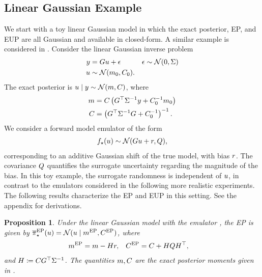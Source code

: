 \documentclass[12pt]{article}
\newtheorem{prop}{Proposition}
\begin{document}
\subsection{Linear Gaussian Example}
We start with a toy linear Gaussian model in which the exact posterior, EP, and EUP are all 
Gaussian and available in closed-form. A similar example is considered in
\citet{garegnani2021NoisyMCMC}.
Consider the linear Gaussian inverse problem
\begin{align}
y &= G u + \epsilon
&&\epsilon \sim \mathcal{N}(0, \Sigma) \label{eq:lin-Gauss-inv-prob} \\
u &\sim \mathcal{N}(m_0, C_0). \nonumber
\end{align}
The exact posterior is $u \mid y \sim \mathcal{N}(m, C)$, where
\begin{align}
m &= C \left(G^\top \Sigma^{-1}y + C_0^{-1}m_0 \right) \label{eq:lin-Gauss-post-moments} \\
C &= \left(G^\top \Sigma^{-1}G + C_0^{-1} \right)^{-1}. \nonumber
\end{align}
We consider a forward model emulator of the form
\begin{align}
{f}_{\star}(u) \sim \mathcal{N}(Gu + r, Q) \label{eq:lin-Gauss-em}, 
\end{align}
corresponding to an additive Gaussian shift of the true model, with bias $r$.
The covariance $Q$ quantifies the surrogate uncertainty regarding the magnitude of the bias.
In this toy example, the surrogate randomness is independent of $u$, in contrast to the 
emulators considered in the following more realistic experiments.
The following results characterize the EP and EUP in this setting. See the appendix for derivations.

\begin{prop}
Under the linear Gaussian model  with the emulator ,
the EP is given by ${\overline{\pi}}_{\star}^{\mathrm{EP}}(u) = \mathcal{N}(u \mid m^{\mathrm{EP}}, C^{\mathrm{EP}})$, where
\begin{align*}
m^{\mathrm{EP}} &= m - H r,
&&C^{\mathrm{EP}} = C + H Q H^\top,
\end{align*}
and $H \coloneqq C G^\top \Sigma^{-1}$. The quantities $m, C$ are the 
exact posterior moments given in .
\end{prop}
\end{document}

